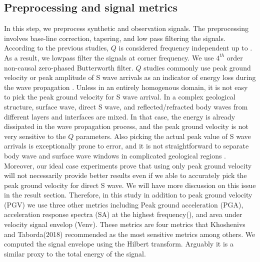 \subsection{Preprocessing and signal metrics}

In this step, we preprocess synthetic and observation signals. The preprocessing involves base-line correction, tapering, and low pass filtering the signals. According to the previous studies, $Q$ is considered frequency independent up to . As a result, we lowpass filter the signals at  corner frequency. We use $4^{th}$ order non-causal zero-phased Butterworth filter. $Q$ studies commonly use peak ground velocity or peak amplitude of S wave arrivals as an indicator of energy loss during the wave propagation \citep[e.g., see ][]{Olsen_2003_BSSA}. Unless in an entirely homogenous domain, it is not easy to pick the peak ground velocity for S wave arrival. In a complex geological structure, surface wave, direct S wave, and reflected/refracted body waves from different layers and interfaces are mixed. In that case, the energy is already dissipated in the wave propagation process, and the peak ground velocity is not very sensitive to the $Q$ parameters. Also picking the actual peak value of S wave arrivals is exceptionally prone to error, and it is not straightforward to separate body wave and surface wave windows in complicated geological regions \citep[e.g., see][]{Bowden_2017_GRL}. Moreover, our ideal case experiments prove that using only peak ground velocity will not necessarily provide better results even if we able to accurately pick the peak ground velocity for direct S wave. We will have more discussion on this issue in the result section. Therefore, in this study in addition to peak ground velocity (PGV) we use three other metrics including Peak ground acceleration (PGA), acceleration response spectra (SA) at the highest frequency(), and area under velocity signal envelop (Venv). These metrics are four metrics that Khoshenivs and Taborda(2018) recommended as the most sensitive metrics among others. We computed the signal envelope using the Hilbert transform. Arguably it is a similar proxy to the total energy of the signal. 











